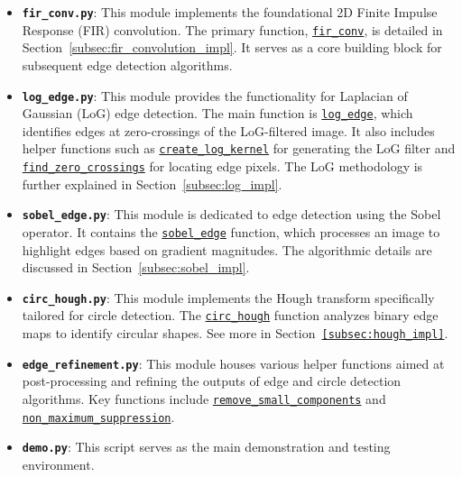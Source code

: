 \documentclass[12pt,a4paper]{article}
\begin{document}
\begin{itemize}
    \item \textbf{\texttt{fir\_conv.py}}: This module implements the foundational 2D Finite Impulse Response (FIR) convolution. The primary function, \href{Code/fir_conv.py}{\texttt{fir\_conv}}, is detailed in Section~\ref{subsec:fir_convolution_impl}. It serves as a core building block for subsequent edge detection algorithms.

    \item \textbf{\texttt{log\_edge.py}}: This module provides the functionality for Laplacian of Gaussian (LoG) edge detection. The main function is \href{Code/log_edge.py}{\texttt{log\_edge}}, which identifies edges at zero-crossings of the LoG-filtered image. It also includes helper functions such as \href{Code/log_edge.py}{\texttt{create\_log\_kernel}} for generating the LoG filter and \href{Code/log_edge.py}{\texttt{find\_zero\_crossings}} for locating edge pixels. The LoG methodology is further explained in Section~\ref{subsec:log_impl}.

    \item \textbf{\texttt{sobel\_edge.py}}: This module is dedicated to edge detection using the Sobel operator. It contains the \href{Code/sobel_edge.py}{\texttt{sobel\_edge}} function, which processes an image to highlight edges based on gradient magnitudes. The algorithmic details are discussed in Section~\ref{subsec:sobel_impl}.

    \item \textbf{\texttt{circ\_hough.py}}: This module implements the Hough transform specifically tailored for circle detection. The \href{Code/circ_hough.py}{\texttt{circ\_hough}} function analyzes binary edge maps to identify circular shapes. See more in Section~\texttt{\ref{subsec:hough_impl}}.
    
    \item \textbf{\texttt{edge\_refinement.py}}: This module houses various helper functions aimed at post-processing and refining the outputs of edge and circle detection algorithms. Key functions include \href{Code/result_refinement.py}{\texttt{remove\_small\_components}} and \href{Code/result_refinement.py}{\texttt{non\_maximum\_suppression}}.

    \item \textbf{\texttt{demo.py}}: This script serves as the main demonstration and testing environment.
\end{itemize}
\end{document}
